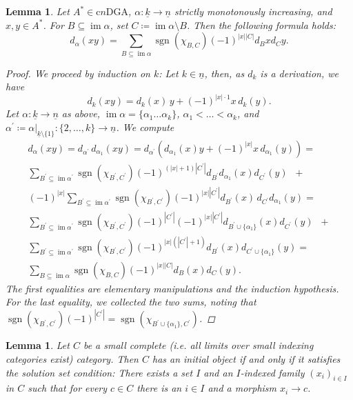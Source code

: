 \documentclass[10pt, a4paper, UKenglish]{article}
\numberwithin{equation}{section}
\newcommand{\defas}{\coloneqq}  %
\newcommand{\abs}[1]{\left\vert#1\right\vert}	%
\newcommand{\ind}[1]{\underline{#1}}
\renewcommand{\k}{\ind{k}}
\newcommand{\n}{\ind{n}}
\newcommand{\sgn}{\operatorname{sgn}}
\newcommand{\im}{\operatorname{im}}
\newcommand{\cndga}{\mathrm{c}n\mathrm{DGA}}
\theoremstyle{plain}
\newtheorem{lem}[equation]{Lemma}
\theoremstyle{definition}
\renewcommand{\to}{\longrightarrow}
\begin{document}
%
%
\begin{lem}\label{lem_higher_leibniz_rel}
Let $A^* \in \cndga$, $\alpha:\k \to \n$ strictly monotonously increasing, and $x,y \in A^*$. For $B \subseteq \im \alpha$, set $C \defas \im \alpha \setminus B$. Then the following formula holds:%
    \[ d_\alpha (xy) = \sum_{B \subseteq \im \alpha} \sgn( \chi_{B,C} ) (-1)^{\abs{x}\abs{C}} d_B x d_C y. \]
\begin{proof}
We proceed by induction on $k$: Let $k \in \n$, then, as $d_k$ is a derivation, we have
\[ d_k(xy) = d_k(x) \, y + (-1)^{\abs{x} \cdot 1} x \, d_k(y). \]
Let $\alpha: \k \to \n$ as above, $\im \alpha = \{ \alpha_1 \ldots \alpha_k \}$, $\alpha_1 \less \ldots \less \alpha_k$, and $\alpha^\prime \defas \alpha|_{\k \setminus \{1\}}:\{2,\ldots,k\} \to \n$. We compute
\begin{gather*}
  d_\alpha (xy) = d_{\alpha^\prime}\,d_{\alpha_1}(xy) =%
    d_{\alpha^\prime}( d_{\alpha_1}(x) y + (-1)^{\abs{x}} x \, d_{\alpha_1}(y) ) =\\[.3em]
  \sum_{B^\prime \subseteq \im \alpha^\prime} \sgn(\chi_{B^\prime,C^\prime}) %
    (-1)^{ (\abs{x}+1) \abs{C^\prime} } d_{B^\prime} d_{\alpha_1}(x)d_{C^\prime}(y) \;\; + \\%
  (-1)^{\abs{x}} \sum_{B^\prime \subseteq \im \alpha^\prime}%
    \sgn(\chi_{B^\prime,C^\prime}) (-1)^{ \abs{x} \abs{C^\prime} } %
    d_{B^\prime}(x) \, d_{C^\prime}d_{\alpha_1}(y) = \\ %
  \sum_{B^\prime \subseteq \im \alpha^\prime} \sgn(\chi_{B^\prime,C^\prime}) %
    (-1)^{\abs{C^\prime}}(-1)^{ \abs{x} \abs{C^\prime} } %
    d_{B^\prime \cup \{\alpha_1\} }(x) d_{C^\prime}(y) \;\; + \\%
  \sum_{B^\prime \subseteq \im \alpha^\prime} \sgn(\chi_{B^\prime,C^\prime}) %
    (-1)^{\abs{x}(\abs{C^\prime}+1)} %
    d_{B^\prime}(x) d_{C^\prime \cup \{\alpha_1\}}(y) = \\%
  \sum_{B \subseteq \im \alpha} \sgn( \chi_{B,C} ) (-1)^{\abs{x}\abs{C}} d_B (x) d_C (y).
\end{gather*}
The first equalities are elementary manipulations and the induction hypothesis. For the last equality, we collected the two sums, noting that %
  $\sgn(\chi_{B^\prime,C^\prime})(-1)^{\abs{C^\prime}} = %
    \sgn(\chi_{B^\prime \cup \{\alpha_1\},C^\prime})$.
\end{proof}
\end{lem}
%
%
\begin{lem}\label{lem_freyds_adjoint_functor}\cite[V.6 Theorem 1]{mac1978categories}
Let $C$ be a small complete (i.e. all limits over small indexing categories exist) category. Then $C$ has an initial object if and only if it satisfies the solution set condition: There exists a set $I$ and an $I$-indexed family $(x_i)_{i \in I}$ in $C$ such that for every $c \in C$ there is an $i \in I$ and a morphism $x_i \to c$.
\end{lem}
\end{document}
